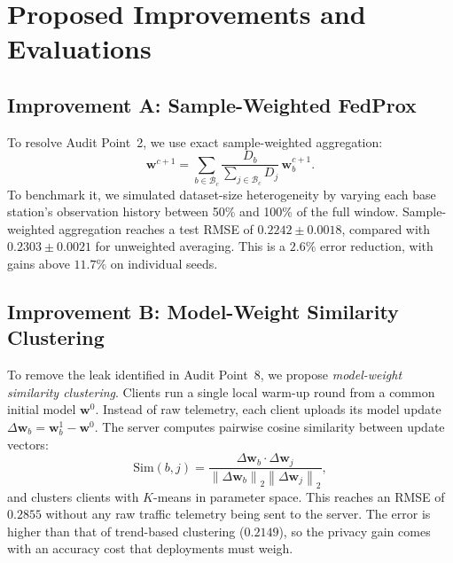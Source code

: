 \documentclass[11pt,a4paper]{article}
\begin{document}
\section{Proposed Improvements and Evaluations}

\subsection{Improvement A: Sample-Weighted FedProx}
To resolve Audit Point~2, we use exact sample-weighted aggregation:
\begin{equation}
    \mathbf{w}^{c+1} = \sum_{b \in \mathcal{B}_c} \frac{D_b}{\sum_{j \in \mathcal{B}_c} D_j}\, \mathbf{w}_b^{c+1}.
\end{equation}
To benchmark it, we simulated dataset-size heterogeneity by varying each base station's observation history between 50\% and 100\% of the full window. Sample-weighted aggregation reaches a test RMSE of $0.2242 \pm 0.0018$, compared with $0.2303 \pm 0.0021$ for unweighted averaging. This is a $2.6\%$ error reduction, with gains above $11.7\%$ on individual seeds.

\subsection{Improvement B: Model-Weight Similarity Clustering}
To remove the leak identified in Audit Point~8, we propose \textit{model-weight similarity clustering}. Clients run a single local warm-up round from a common initial model $\mathbf{w}^0$. Instead of raw telemetry, each client uploads its model update $\Delta\mathbf{w}_b = \mathbf{w}_b^1 - \mathbf{w}^0$. The server computes pairwise cosine similarity between update vectors:
\begin{equation}
    \text{Sim}(b, j) = \frac{\Delta\mathbf{w}_b \cdot \Delta\mathbf{w}_j}{\left\|\Delta\mathbf{w}_b\right\|_2 \left\|\Delta\mathbf{w}_j\right\|_2},
\end{equation}
and clusters clients with $K$-means in parameter space. This reaches an RMSE of $0.2855$ without any raw traffic telemetry being sent to the server. The error is higher than that of trend-based clustering ($0.2149$), so the privacy gain comes with an accuracy cost that deployments must weigh.
\end{document}
